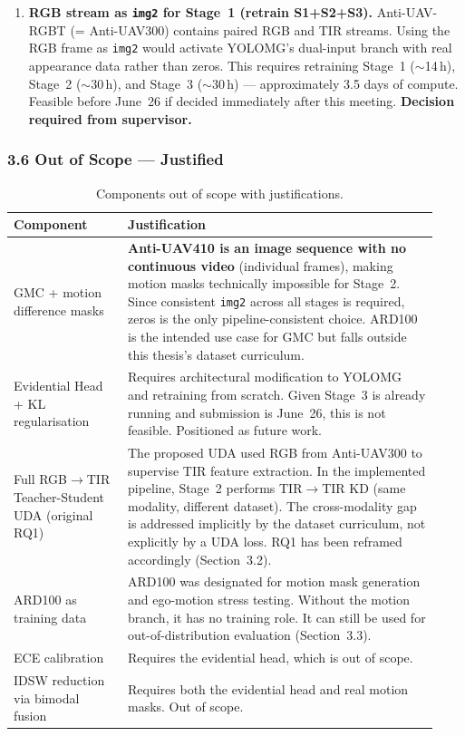 \begin{enumerate}
    \item \textbf{RGB stream as \texttt{img2} for Stage~1 (retrain S1+S2+S3).}
    Anti-UAV-RGBT (= Anti-UAV300) contains paired RGB and TIR streams.
    Using the RGB frame as \texttt{img2} would activate YOLOMG's
    dual-input branch with real appearance data rather than zeros.
    This requires retraining Stage~1 ($\sim$14\,h), Stage~2
    ($\sim$30\,h), and Stage~3 ($\sim$30\,h) — approximately
    3.5 days of compute. Feasible before June~26 if decided
    immediately after this meeting.
    \textbf{Decision required from supervisor.}
\end{enumerate}

\subsubsection*{3.6 Out of Scope — Justified}

\begin{table}[h]
\centering
\caption{Components out of scope with justifications.}
\label{tab:out_of_scope}
\small
\begin{tabular}{p{0.25\linewidth}p{0.68\linewidth}}
\hline
\textbf{Component} & \textbf{Justification} \\
\hline
GMC + motion difference masks
& \textbf{Anti-UAV410 is an image sequence with no continuous video}
  (individual frames), making motion masks technically impossible for
  Stage~2. Since consistent \texttt{img2} across all stages is required,
  zeros is the only pipeline-consistent choice. ARD100 is the intended
  use case for GMC but falls outside this thesis's dataset curriculum. \\[4pt]

Evidential Head + KL regularisation
& Requires architectural modification to YOLOMG and retraining from
  scratch. Given Stage~3 is already running and submission is
  June~26, this is not feasible. Positioned as future work. \\[4pt]

Full RGB$\to$TIR Teacher-Student UDA (original RQ1)
& The proposed UDA used RGB from Anti-UAV300 to supervise TIR
  feature extraction. In the implemented pipeline, Stage~2 performs
  TIR$\to$TIR KD (same modality, different dataset). The cross-modality
  gap is addressed implicitly by the dataset curriculum, not explicitly
  by a UDA loss. RQ1 has been reframed accordingly (Section~3.2). \\[4pt]

ARD100 as training data
& ARD100 was designated for motion mask generation and ego-motion
  stress testing. Without the motion branch, it has no training role.
  It can still be used for out-of-distribution evaluation (Section~3.3). \\[4pt]

ECE calibration
& Requires the evidential head, which is out of scope. \\[4pt]

IDSW reduction via bimodal fusion
& Requires both the evidential head and real motion masks.
  Out of scope. \\
\hline
\end{tabular}
\end{table}

